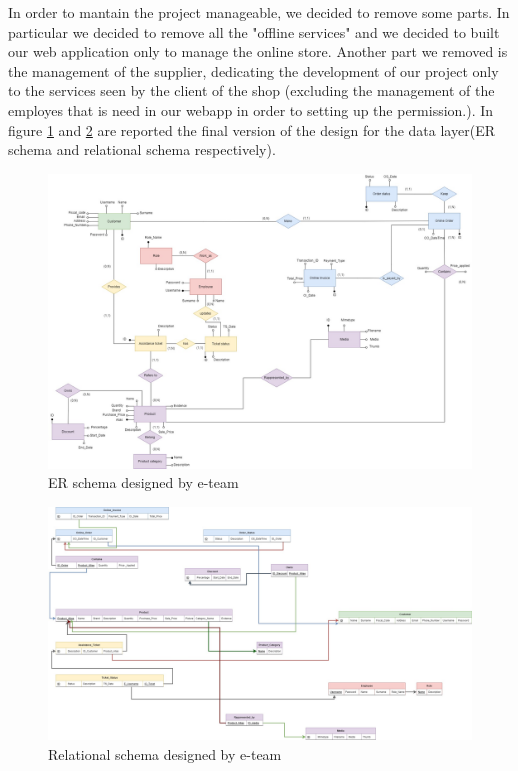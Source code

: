 In order to mantain the project manageable, we decided to remove some parts. In particular we decided to remove all the "offline services" and we decided to built our web application only to manage the online store.
Another part we removed is the management of the supplier, dedicating the development of our project only to the services seen by the client of the shop (excluding the management of the employes that is need in our webapp in order to setting up the permission.). In figure \ref{er_modified} and \ref{ls_modified} are reported the final version of the design for the data layer(ER schema and relational schema respectively).

\begin{figure}[H]
\centering
\includegraphics[width=17cm]{Schemas/ER_modified.jpg}
\caption{ER schema designed by e-team}
\label{er_modified}
\end{figure}

\begin{figure}[H]
\centering
\includegraphics[width=17cm]{Schemas/LogicRS_modified.jpg}
\caption{Relational schema designed by e-team}
\label{ls_modified}
\end{figure}